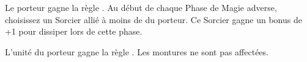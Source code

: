 \armymagicalbanners

\startpricelist

Le porteur gagne la règle \channel{}. Au début de chaque Phase de Magie adverse, choisissez un Sorcier allié à moins de  du porteur. Ce Sorcier gagne un bonus de +1 pour dissiper lors de cette phase.

L'unité du porteur gagne la règle \thunderouscharge{}. Les montures ne sont pas affectées.

\endpricelist

\closearmymagicalitems








\quickrefsheettitle


